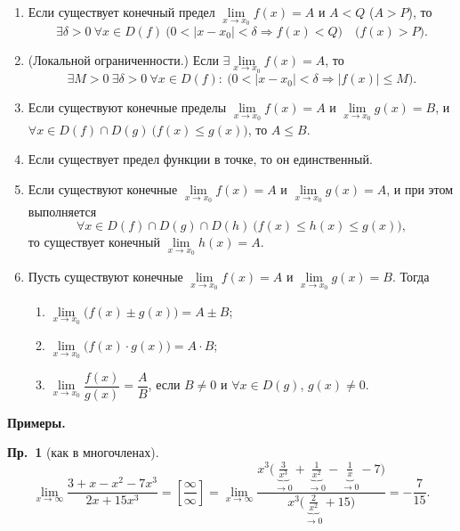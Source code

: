 \documentclass[a4paper,11pt]{article}
\begin{document}
\begin{enumerate}
  \item Если существует конечный предел $\lim\limits_{x \to x_0} f(x) = A$ и $A < Q$ ($A > P$), то
    \[
      \exists \delta > 0\ \forall x \in D(f)\ \bigl( 0 < |x - x_0| < \delta \Rightarrow f(x) < Q \bigr)
      \quad \bigl( f(x) > P \bigr).
    \]
  \item (Локальной ограниченности.) Если $\exists \lim\limits_{x \to x_0} f(x) = A$, то
    \[
      \exists M > 0\ \exists \delta > 0\ \forall x \in D(f):\ \bigl( 0 < |x - x_0| < \delta \Rightarrow |f(x)| \le M \bigr).
    \]
  \item Если существуют конечные пределы $\lim\limits_{x \to x_0} f(x) = A$ и
    $\lim\limits_{x \to x_0} g(x) = B$, и
    $\forall x \in D(f) \cap D(g)\ \bigl( f(x) \le g(x) \bigr)$, то $A \le B$.
  \item Если существует предел функции в точке, то он единственный.
  \item Если существуют конечные $\lim\limits_{x \to x_0} f(x) = A$ и
    $\lim\limits_{x \to x_0} g(x) = A$, и при этом выполняется
    \[
      \forall x \in D(f) \cap D(g) \cap D(h)\ \bigl( f(x) \le h(x) \le g(x) \bigr),
    \]
    то существует конечный $\lim\limits_{x \to x_0} h(x) = A$.
  \item Пусть существуют конечные $\lim\limits_{x \to x_0} f(x) = A$ и
    $\lim\limits_{x \to x_0} g(x) = B$. Тогда
    \begin{enumerate}
      \item $\lim\limits_{x \to x_0} \bigl( f(x) \pm g(x) \bigr) = A \pm B$;
      \item $\lim\limits_{x \to x_0} \bigl( f(x) \cdot g(x) \bigr) = A \cdot B$;
      \item $\lim\limits_{x \to x_0} \dfrac{f(x)}{g(x)} = \dfrac{A}{B}$,
        если $B \ne 0$ и $\forall x \in D(g)$, $g(x) \ne 0$.
    \end{enumerate}
\end{enumerate}

\textbf{Примеры.}

\textbf{Пр.~1} (как в многочленах).
\[
  \lim_{x \to \infty} \frac{3 + x - x^2 - 7x^3}{2x + 15x^3}
  = \left[\frac{\infty}{\infty}\right]
  = \lim_{x \to \infty} \frac{x^3 \Big(\underbrace{\tfrac{3}{x^3}}_{\to 0} + \underbrace{\tfrac{1}{x^2}}_{\to 0} - \underbrace{\tfrac{1}{x}}_{\to 0} - 7\Big)}{x^3 \Big(\underbrace{\tfrac{2}{x^2}}_{\to 0} + 15\Big)}
  = -\frac{7}{15}.
\]
\end{document}
